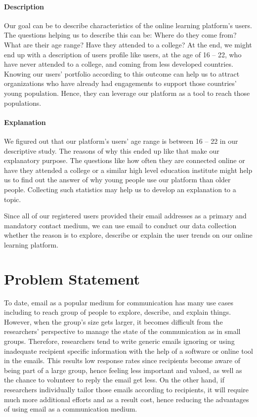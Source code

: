 \paragraph{Description}
Our goal can be to describe characteristics of the online learning platform's users. The questions helping us to describe this can be: Where do they come from? What are their age range? Have they attended to a college? At the end, we might end up with a description of users profile like users, at the age of 16 -- 22, who have never attended to a college, and coming from less developed countries. Knowing our users' portfolio according to this outcome can help us to attract organizations who have already had engagements to support those countries' young population. Hence, they can leverage our platform as a tool to reach those populations.

\paragraph{Explanation}
We figured out that our platform's users' age range is between 16 -- 22 in our descriptive study. The reasons of why this ended up like that make our explanatory purpose. The questions like how often they are connected online or have they attended a college or a similar high level education institute might help us to find out the answer of why young people use our platform than older people. Collecting such statistics may help us to develop an explanation to a topic.

\vspace{1cm}
Since all of our registered users provided their email addresses as a primary and mandatory contact medium, we can use email to conduct our data collection whether the reason is to explore, describe or explain the user trends on our online learning platform.

\section{Problem Statement}
\label{sec:2:Problem}

To date, email as a popular medium for communication has many use cases including to reach group of people to explore, describe, and explain things. However, when the group's size gets larger, it becomes difficult from the researchers' perspective to manage the state of the communication as in small groups. Therefore, researchers tend to write generic emails ignoring or using inadequate recipient specific information with the help of a software or online tool in the emails. This results low response rates since recipients become aware of being part of a large group, hence feeling less important and valued, as well as the chance to volunteer to reply the email get less. On the other hand, if researchers individually tailor those emails according to recipients, it will require much more additional efforts and as a result cost, hence reducing the advantages of using email as a communication medium.
\vspace{1cm}

